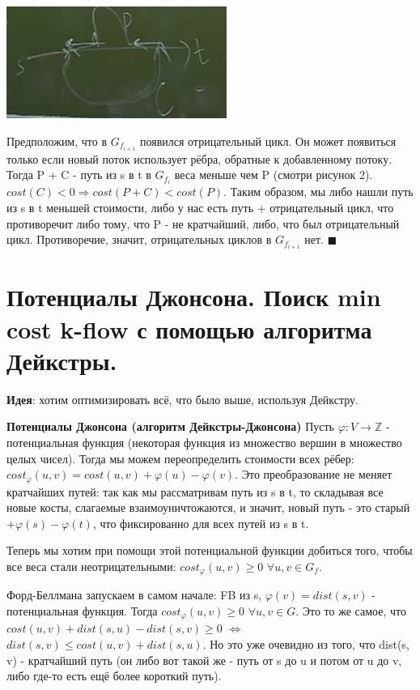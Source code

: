\includegraphics[height = 2 cm]{images/87-92_90_min}

Предположим, что в $G_{f_{i+1}}$ появился отрицательный цикл. Он может появиться только если новый поток использует рёбра, обратные к добавленному потоку. Тогда P + C - путь из s в t в $G_{f_i}$ веса меньше чем P (смотри рисунок 2). $cost (C) < 0 \Rightarrow cost(P + C) < cost (P)$. Таким образом, мы либо нашли путь из s в t меньшей стоимости, либо у нас есть путь + отрицательный цикл, что противоречит либо тому, что P - не кратчайший, либо, что был отрицательный цикл. Противоречие, значит, отрицательных циклов в $G_{f_{i+1}}$ нет.
$\blacksquare$

\setcounter{section}{90}
\section{Потенциалы Джонсона. Поиск min cost k-flow с помощью алгоритма Дейкстры.}

\textbf{Идея}: хотим оптимизировать всё, что было выше, используя Дейкстру.

\textbf{Потенциалы Джонсона (алгоритм Дейкстры-Джонсона)} Пусть $\varphi: V \rightarrow \mathbb{Z}$ - потенциальная функция (некоторая функция из множество вершин в множество целых чисел). Тогда мы можем переопределить стоимости всех рёбер: $cost_\varphi (u, v) = cost(u, v) + \varphi(u) - \varphi(v)$. Это преобразование не меняет кратчайших путей: так как мы рассматривам путь из s в t, то складывая все новые косты, слагаемые взаимоуничтожаются, и значит, новый путь - это старый $+ \varphi(s) - \varphi(t)$, что фиксированно для всех путей из s в t. 

Теперь мы хотим при помощи этой потенциальной функции добиться того, чтобы все веса стали неотрицательными: $cost_\varphi (u, v) \geqslant 0$ $\forall u, v \in G_f$. 

Форд-Беллмана запускаем в самом начале: FB из s, $\varphi(v) = dist(s, v)$ - потенциальная функция. Тогда $cost_\varphi (u, v) \geqslant 0$ $\forall u, v \in G$. Это то же самое, что $cost(u, v) + dist(s, u) - dist(s, v) \geqslant 0$ $\Leftrightarrow$ $dist(s, v) \leqslant cost(u, v) + dist(s, u)$. Но это уже очевидно из того, что dist(s, v) - кратчайший путь (он либо вот такой же - путь от s до u и потом от u до v, либо где-то есть ещё более короткий путь).

